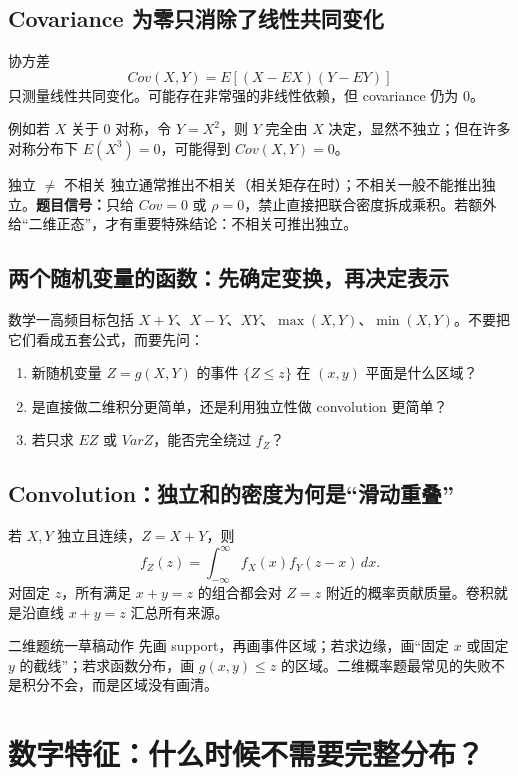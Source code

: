 \documentclass[11pt,a4paper,openany]{ctexbook}
\begin{document}
\section{Covariance 为零只消除了线性共同变化}
协方差
\[
Cov(X,Y)=E[(X-EX)(Y-EY)]
\]
只测量线性共同变化。可能存在非常强的非线性依赖，但 covariance 仍为 0。

例如若 $X$ 关于 0 对称，令 $Y=X^2$，则 $Y$ 完全由 $X$ 决定，显然不独立；但在许多对称分布下 $E(X^3)=0$，可能得到 $Cov(X,Y)=0$。

\begin{boundarybox}{独立 $\neq$ 不相关}
独立通常推出不相关（相关矩存在时）；不相关一般不能推出独立。\textbf{题目信号：}只给 $Cov=0$ 或 $\rho=0$，禁止直接把联合密度拆成乘积。若额外给“二维正态”，才有重要特殊结论：不相关可推出独立。
\end{boundarybox}

\section{两个随机变量的函数：先确定变换，再决定表示}
数学一高频目标包括 $X+Y$、$X-Y$、$XY$、$\max(X,Y)$、$\min(X,Y)$。不要把它们看成五套公式，而要先问：
\begin{enumerate}
  \item 新随机变量 $Z=g(X,Y)$ 的事件 $\{Z\le z\}$ 在 $(x,y)$ 平面是什么区域？
  \item 是直接做二维积分更简单，还是利用独立性做 convolution 更简单？
  \item 若只求 $EZ$ 或 $VarZ$，能否完全绕过 $f_Z$？
\end{enumerate}

\section{Convolution：独立和的密度为何是“滑动重叠”}
若 $X,Y$ 独立且连续，$Z=X+Y$，则
\[
f_Z(z)=\int_{-\infty}^{\infty}f_X(x)f_Y(z-x)\,dx.
\]
对固定 $z$，所有满足 $x+y=z$ 的组合都会对 $Z=z$ 附近的概率贡献质量。卷积就是沿直线 $x+y=z$ 汇总所有来源。

\begin{methodbox}{二维题统一草稿动作}
先画 support，再画事件区域；若求边缘，画“固定 $x$ 或固定 $y$ 的截线”；若求函数分布，画 $g(x,y)\le z$ 的区域。二维概率题最常见的失败不是积分不会，而是区域没有画清。
\end{methodbox}

\chapter{数字特征：什么时候不需要完整分布？}
\end{document}
